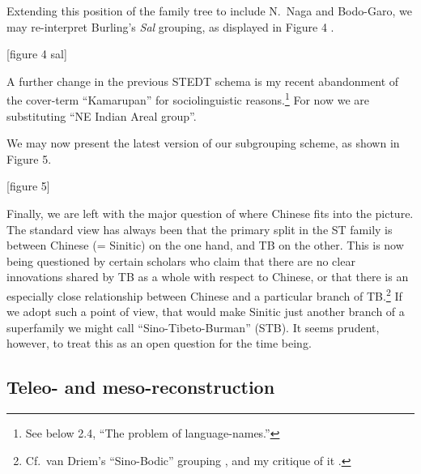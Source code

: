 Extending this position of the family tree to include N.\ Naga and Bodo-Garo, we may re-interpret Burling’s {\it Sal} grouping, as displayed in Figure 4 \citep[40]{Matisoff2013}.

[figure 4 sal]

A further change in the previous STEDT schema is my recent abandonment of the cover-term “Kamarupan” for sociolinguistic reasons.\footnote{See below 2.4, “The problem of language-names.”} For now we are substituting “NE Indian Areal group”.

We may now present the latest version of our subgrouping scheme, as shown in Figure 5.

[figure 5]

Finally, we are left with the major question of where Chinese fits into the picture. The standard view has always been that the primary split in the ST family is between Chinese (= Sinitic) on the one hand, and TB on the other. This is now being questioned by certain scholars who claim that there are no clear innovations shared by TB as a whole with respect to Chinese, or that there is an especially close relationship between Chinese and a particular branch of TB.\footnote{Cf.\ van Driem’s “Sino-Bodic” grouping \citep{SVD-SB}, and my critique of it \citep{Matisoff2006}.} If we adopt such a point of view, that would make Sinitic just another branch of a superfamily we might call “Sino-Tibeto-Burman” (STB). It seems prudent, however, to treat this as an open question for the time being.


\subsection{Teleo- and meso-reconstruction}

